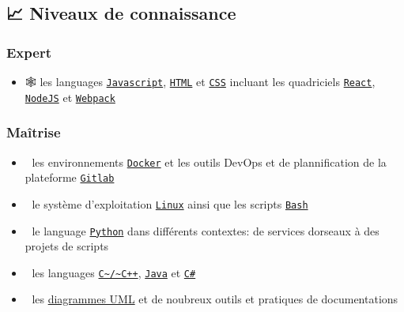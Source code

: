 \documentclass[11pt]{article}
\begin{document}
\subsection{📈 Niveaux de connaissance}
\label{sec:org8a92585}
\subsubsection{Expert}
\label{sec:org73ca280}
\begin{itemize}
\item 🕸 les languages \href{https://www.javascript.com/}{\texttt{Javascript}}, \href{https://html.spec.whatwg.org/multipage/}{\texttt{HTML}} et \href{https://www.w3.org/Style/CSS/}{\texttt{CSS}} incluant les quadriciels \href{https://reactjs.org/}{\texttt{React}}, \href{https://nodejs.org}{\texttt{NodeJS}} et \href{https://webpack.js.org/}{\texttt{Webpack}}
\end{itemize}

\subsubsection{Maîtrise}
\label{sec:org41ad8dd}
\begin{itemize}
\item 🐋 les environnements \href{https://www.docker.com/}{\texttt{Docker}} et les outils DevOps et de plannification de la plateforme \href{https://about.gitlab.com/}{\texttt{Gitlab}}
\item 🐧 le système d'exploitation \href{https://kernel.org/}{\texttt{Linux}} ainsi que les scripts \href{https://www.gnu.org/software/bash/}{\texttt{Bash}}
\item 🐍 le language \href{https://www.python.org/}{\texttt{Python}} dans différents contextes: de services dorseaux à des projets de scripts
\item 🤖 les languages \href{https://en.cppreference.com/w/}{\texttt{C\textasciitilde{}/\textasciitilde{}C++}}, \href{https://www.java.com/en/}{\texttt{Java}} et \href{https://dotnet.microsoft.com/en-us/}{\texttt{C\#}}
\item 📝 les \href{https://www.uml-diagrams.org/}{diagrammes UML} et de noubreux outils et pratiques de documentations
\end{itemize}
\end{document}
